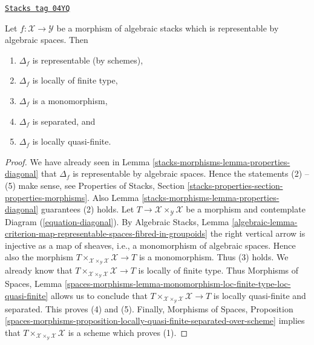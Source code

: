 \begin{lemma}
\label{stacks-morphisms-lemma-properties-diagonal-representable}
\href{https://stacks.math.columbia.edu/tag/04YQ}{\texttt{Stacks tag 04YQ}}

Let $f : \mathcal{X} \to \mathcal{Y}$ be a morphism of algebraic stacks
which is representable by algebraic spaces. Then
\begin{enumerate}
\item $\Delta_f$ is representable
(by schemes),
\item $\Delta_f$ is locally of finite type,
\item $\Delta_f$ is a monomorphism,
\item $\Delta_f$ is separated, and
\item $\Delta_f$ is locally quasi-finite.
\end{enumerate}
\end{lemma}

\begin{proof}
We have already seen in
Lemma \ref{stacks-morphisms-lemma-properties-diagonal}
that $\Delta_f$ is representable by algebraic
spaces. Hence the statements (2) -- (5) make sense, see
Properties of Stacks,
Section \ref{stacks-properties-section-properties-morphisms}.
Also
Lemma \ref{stacks-morphisms-lemma-properties-diagonal}
guarantees (2) holds.
Let $T \to \mathcal{X} \times_\mathcal{Y} \mathcal{X}$ be a morphism
and contemplate Diagram (\ref{equation-diagonal}). By
Algebraic Stacks, Lemma
\ref{algebraic-lemma-criterion-map-representable-spaces-fibred-in-groupoids}
the right vertical arrow is injective as a map of sheaves, i.e., a
monomorphism of algebraic spaces. Hence also the morphism
$T \times_{\mathcal{X} \times_\mathcal{Y} \mathcal{X}} \mathcal{X} \to T$
is a monomorphism. Thus (3) holds. We already know that
$T \times_{\mathcal{X} \times_\mathcal{Y} \mathcal{X}} \mathcal{X} \to T$
is locally of finite type. Thus
Morphisms of Spaces, Lemma
\ref{spaces-morphisms-lemma-monomorphism-loc-finite-type-loc-quasi-finite}
allows us to conclude that
$T \times_{\mathcal{X} \times_\mathcal{Y} \mathcal{X}} \mathcal{X} \to T$
is locally quasi-finite and separated. This proves (4) and (5).
Finally,
Morphisms of Spaces, Proposition
\ref{spaces-morphisms-proposition-locally-quasi-finite-separated-over-scheme}
implies that
$T \times_{\mathcal{X} \times_\mathcal{Y} \mathcal{X}} \mathcal{X}$
is a scheme which proves (1).
\end{proof}

